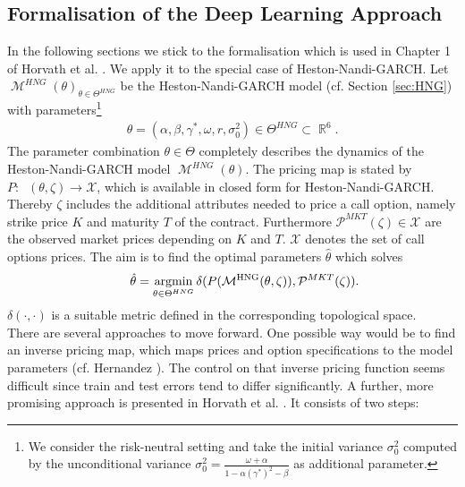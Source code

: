 \documentclass{article}
\DeclareMathOperator{\R}{\mathbb{R}}
\DeclareMathOperator{\M}{\mathcal{M}}
\DeclareMathOperator{\HNG}{\mathcal{M}^{HNG}}
\DeclareMathOperator*{\argmin}{argmin}
\begin{document}
\subsection{Formalisation of the Deep Learning Approach}
In the following sections we stick to the formalisation which is used in Chapter 1 of Horvath et al. \cite{Blanka}. We apply it to the special case of Heston-Nandi-GARCH. \newline 
Let $\M^{HNG}(\theta)_{\theta \in \Theta^{HNG}}$ be the Heston-Nandi-GARCH model (cf. Section \ref{sec:HNG}) with parameters\footnote{We consider the risk-neutral setting and take the initial variance $\sigma_0^2$ computed by the unconditional variance $\sigma_0^2 = \frac{\omega+\alpha}{1-\alpha(\gamma^*)^2-\beta}$ as additional parameter.} 
\begin{align}
\theta = (\alpha, \beta, \gamma^*, \omega, r, \sigma_0^2) \in \Theta^{HNG} \subset \R^6. \label{eq:param}
\end{align} 
The parameter combination $\theta \in \Theta$ completely describes the dynamics of the Heston-Nandi-GARCH model $\M^{HNG}(\theta)$. \newline
The pricing map is stated by $P: \HNG(\theta, \zeta) \to \mathcal{X}$, which is available in closed form for Heston-Nandi-GARCH. Thereby $\zeta$ includes the additional attributes needed to price a call option, namely strike price $K$ and maturity $T$ of the contract. Furthermore $\mathcal{P}^{MKT}(\zeta) \in \mathcal{X}$ are the observed market prices depending on $K$ and $T$. $\mathcal{X}$ denotes the set of call options prices. The aim is to find the optimal parameters $\hat{\theta}$ which solves
\begin{align*}
    \hspace{0.7cm}\hat{\theta} = \argmin_{\theta\in \Theta^{HNG}} \delta(P(\HNG(\theta, \zeta)), \mathcal{P}^{MKT}(\zeta)).
\end{align*}
$\delta(\cdot,\cdot)$ is a suitable metric defined in the corresponding topological space. \\
There are several approaches to move forward. One possible way would be to find an inverse pricing map, which maps prices and option specifications to the model parameters (cf. Hernandez \cite{Hernandez}). 
The control on that inverse pricing function seems difficult since train and test errors tend to differ significantly. \newline
A further, more promising approach is presented in Horvath et al. \cite{Blanka}. It consists of two steps:
\end{document}
